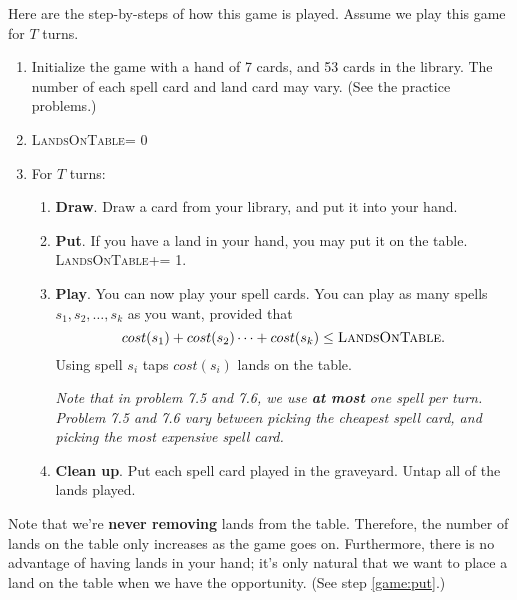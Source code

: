 \documentclass[10pt, leqno]{exam}
\begin{document}
    Here are the step-by-steps of how this game is played. Assume we play
    this game for $T$ turns.
    \newcommand{\landsontable}{\textsc{LandsOnTable}\xspace}
    \begin{enumerate}[1.]
    \item Initialize the game with a hand of 7 cards, and 53 cards in the
    library. The number of each spell card and land card may vary. (See
    the practice problems.)
    \item \landsontable = 0
    \item For $T$ turns:
        \begin{enumerate}
        \item \textbf{Draw}. Draw a card from your library, and put it into your hand.
        \item \textbf{Put}. \label{game:put}
        If you have a land in your hand, you may put it on the table.
        \landsontable += 1.

        \item \textbf{Play}. \label{game:play}
        You can now play your spell cards. You can play
        as many spells $s_1, s_2, \dots, s_k$ as you want, provided that
        $$cost(s_1) + cost(s_2) \dots + cost(s_k) \leq \landsontable.$$
        Using spell $s_i$ taps $cost(s_i)$ lands on the table.

        \textit{Note that in problem 7.5 and 7.6, we use \textbf{at most} one spell
        per turn. Problem 7.5 and 7.6 vary between picking the cheapest
        spell card, and picking the most expensive spell card.}

        \item \textbf{Clean up}. \label{game:clean}
        Put each spell card played in the graveyard.
        Untap all of the lands played.
        \end{enumerate}
    \end{enumerate}
    Note that we're \textbf{never removing} lands from the table. Therefore,
    the number of lands on the table only increases as the game goes on.
    Furthermore, there is no advantage of having lands in your hand; it's only
    natural that we want to place a land on the table when we have the opportunity.
    (See step \ref{game:put}.)
\end{document}
